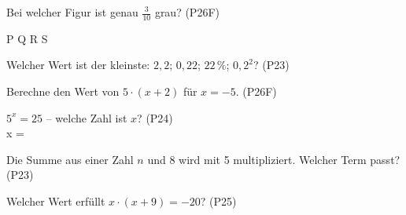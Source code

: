 \documentclass[11pt]{article}
\begin{document}
\small

\begin{aufgabe}{Bei welcher Figur ist genau $\frac{3}{10}$ grau? \hfill (P26F) \\    }

P  \quad Q  \quad R  \quad S 
\end{aufgabe}

\begin{aufgabe}{Welcher Wert ist der kleinste: $2{,}2$; $0{,}22$; $22\,\%$; $0{,}2^2$? \hfill (P23) \\ \leerfeld}
\end{aufgabe}

\begin{aufgabe}{Berechne den Wert von $5 \cdot (x + 2)$ für $x = -5$. \hfill (P26F) \\ \leerfeld}
\end{aufgabe}

\begin{aufgabe}{$5^x = 25$ – welche Zahl ist $x$? \hfill (P24) \\ x = \leerfeld}
\end{aufgabe}

\begin{aufgabe}{Die Summe aus einer Zahl $n$ und 8 wird mit 5 multipliziert. Welcher Term passt? \hfill (P23) \\    }
\end{aufgabe}

\begin{aufgabe}{Welcher Wert erfüllt $x \cdot (x + 9) = -20$? \hfill (P25) \\    }
\end{aufgabe}
\end{document}
